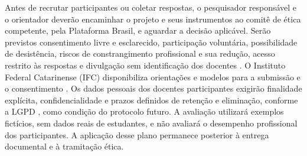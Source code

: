 Antes de recrutar participantes ou coletar respostas, o pesquisador responsável e o orientador deverão encaminhar o projeto e seus instrumentos ao comitê de ética competente, pela Plataforma Brasil, e aguardar a decisão aplicável. Serão previstos consentimento livre e esclarecido, participação voluntária, possibilidade de desistência, riscos de constrangimento profissional e sua redução, acesso restrito às respostas e divulgação sem identificação dos docentes \cite[art.~3, 17, 23 e 28]{CNS5102016}. O Instituto Federal Catarinense (IFC) disponibiliza orientações e modelos para a submissão e o consentimento \cite{IFCCEpshDocumentos}. Os dados pessoais dos docentes participantes exigirão finalidade explícita, confidencialidade e prazos definidos de retenção e eliminação, conforme a LGPD \cite{LGPD2018}, como condição do protocolo futuro. A avaliação utilizará exemplos fictícios, sem dados reais de estudantes, e não avaliará o desempenho profissional dos participantes. A aplicação desse plano permanece posterior à entrega documental e à tramitação ética.

